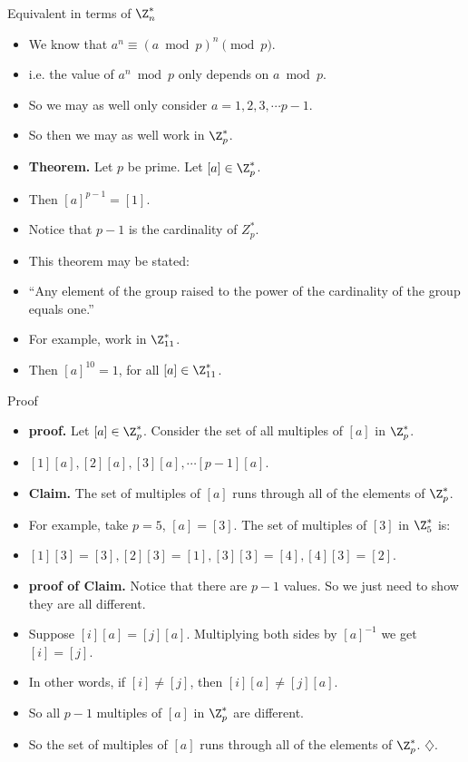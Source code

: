 \documentclass{beamer}
\begin{document}
\begin{frame}{Equivalent in terms of $\Z_n^*$}

\begin{itemize}
  \item We know that $a^n \equiv (a \bmod p)^n \pmod p$.
  \item i.e. the value of $a^n \bmod p$ only depends on $a\bmod p$.
  \item So we may as well only consider $a = 1,2,3,\cdots p-1$.
  \item So then we may as well work in $\Z_p^*$.
  \item \textbf{Theorem.} Let $p$ be prime. Let $[a]\in\Z_p^*$.
  \item Then $[a]^{p-1} = [1]$.
  \item Notice that $p-1$ is the cardinality of $Z_p^*$.
  \item This theorem may be stated:
  \item ``Any element of the group raised to the power of the cardinality of the group equals one.''
  \item For example, work in $\Z_{11}^*$.
  \item Then $[a]^{10} = 1$, for all $[a]\in\Z_{11}^*$.
\end{itemize}

\end{frame}

\begin{frame}{Proof}

\begin{itemize}
  \item \textbf{proof.} Let $[a] \in \Z_p^*$. Consider the set of all multiples of $[a]$ in $\Z_p^*$.
  \item $[1][a], [2][a], [3][a], \cdots [p-1][a]$.
  \item \textbf{Claim.} The set of multiples of $[a]$ runs through all of the elements of $\Z_p^*$.
  \item For example, take $p=5$, $[a]=[3]$. The set of multiples of $[3]$ in $\Z_5^*$ is:
  \item $[1][3]=[3], [2][3]=[1], [3][3]=[4], [4][3] = [2]$.
  \item \textbf{proof of Claim.} Notice that there are $p-1$ values. So we just need to show they are all different.
  \item Suppose $[i][a]=[j][a]$. Multiplying both sides by $[a]^{-1}$ we get $[i]=[j]$.
  \item In other words, if $[i]\not=[j]$, then $[i][a]\not=[j][a]$.
  \item So all $p-1$ multiples of $[a]$ in $\Z_p^*$ are different.
  \item So the set of multiples of $[a]$ runs through all of the elements of $\Z_p^*$. $\diamondsuit$.
\end{itemize}

\end{frame}
\end{document}
